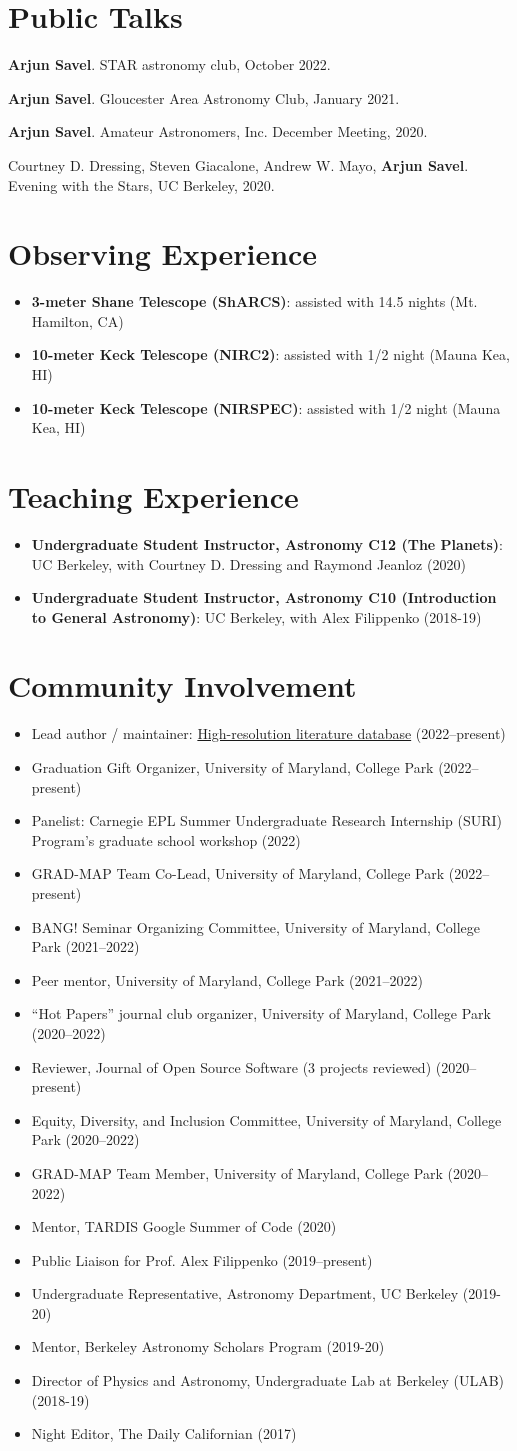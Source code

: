 \documentclass[letterpaper,10.5pt]{article}
\newcommand{\resumeItem}[2]{
  \item\small{
    \textbf{#1}{#2 \vspace{-2pt}}
  }
}
\newcommand{\resumeItemNoBullet}[2]{
  \item[]\small{
    \hspace{-9pt}\textbf{#1}{: #2 \vspace{-6pt}}
  }
}
\newcommand{\resumeSubHeadingListEnd}{\end{itemize}}
\newcommand{\resumeItemListStart}{\begin{itemize}}
\newcommand{\resumeItemListEnd}{\end{itemize}\vspace{-5pt}}
\newcommand{\shorterSection}[1]{\vspace{-10pt}\section{#1}}
\begin{document}
\shorterSection{Public Talks}
\begin{list}{}{\cvlist}
\item[{\color{numcolor}\scriptsize4}] \textbf{Arjun Savel}. STAR astronomy club, October 2022.
\item[{\color{numcolor}\scriptsize3}] \textbf{Arjun Savel}. Gloucester Area Astronomy Club, January 2021.
\item[{\color{numcolor}\scriptsize2}] \textbf{Arjun Savel}. Amateur Astronomers, Inc. December Meeting, 2020.
\item[{\color{numcolor}\scriptsize1}] Courtney D. Dressing, Steven Giacalone, Andrew W. Mayo, \textbf{Arjun Savel}. Evening with the Stars, UC Berkeley, 2020.
\end{list}

\shorterSection{Observing Experience}
\resumeItemListStart
\resumeItemNoBullet{3-meter Shane Telescope (ShARCS)}{assisted with 14.5 nights (Mt. Hamilton, CA)}
\resumeItemNoBullet{10-meter Keck Telescope (NIRC2)}{assisted with 1/2 night (Mauna Kea, HI)}
\resumeItemNoBullet{10-meter Keck Telescope (NIRSPEC)}{assisted with 1/2 night (Mauna Kea, HI)}

\resumeSubHeadingListEnd

\shorterSection{Teaching Experience}
\resumeItemListStart
\resumeItemNoBullet{Undergraduate Student Instructor, Astronomy C12 (The Planets)}{UC Berkeley, with Courtney D. Dressing and Raymond Jeanloz (2020)}
\resumeItemNoBullet{Undergraduate Student Instructor, Astronomy C10 (Introduction to General Astronomy)}{UC Berkeley, with Alex Filippenko (2018-19)}
\resumeSubHeadingListEnd


\shorterSection{Community Involvement}
\resumeItemListStart
\resumeItem{}{Lead author / maintainer: \href{https://www.arjunsavel.com/hires_papers.html}{High-resolution literature database} (2022--present)}
\resumeItem{}{Graduation Gift Organizer, University of Maryland, College Park (2022--present)}
\resumeItem{}{Panelist: Carnegie EPL Summer Undergraduate Research Internship (SURI) Program’s graduate school workshop (2022)}
\resumeItem{}{GRAD-MAP Team Co-Lead, University of Maryland, College Park (2022--present)}
\resumeItem{}{BANG! Seminar Organizing Committee, University of Maryland, College Park (2021--2022)}
\resumeItem{}{Peer mentor, University of Maryland, College Park (2021--2022)}
\resumeItem{}{``Hot Papers'' journal club organizer, University of Maryland, College Park (2020--2022)}
\resumeItem{}{Reviewer, Journal of Open Source Software (3 projects reviewed) (2020--present)}
\resumeItem{}{Equity, Diversity, and Inclusion Committee, University of Maryland, College Park (2020--2022)}
\resumeItem{}{GRAD-MAP Team Member, University of Maryland, College Park (2020--2022)}
\resumeItem{}{Mentor, TARDIS Google Summer of Code (2020)}
\resumeItem{}{Public Liaison for Prof. Alex Filippenko (2019--present)}
\resumeItem{}{Undergraduate Representative, Astronomy Department, UC Berkeley (2019-20)}
\resumeItem{}{Mentor, Berkeley Astronomy Scholars Program (2019-20)}
\resumeItem{}{Director of Physics and Astronomy, Undergraduate Lab at Berkeley (ULAB) (2018-19)}
\resumeItem{}{Night Editor, The Daily Californian (2017)}
\resumeItemListEnd
\end{document}
